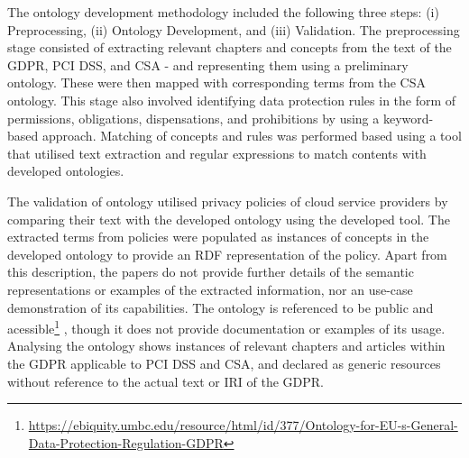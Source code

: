 The ontology development methodology included the following three steps: (i) Preprocessing, (ii) Ontology Development, and (iii) Validation. The preprocessing stage consisted of extracting relevant chapters and concepts from the text of the GDPR, PCI DSS, and CSA - and representing them using a preliminary ontology. These were then mapped with corresponding terms from the CSA ontology. This stage also involved identifying data protection rules in the form of permissions, obligations, dispensations, and prohibitions by using a keyword-based approach. Matching of concepts and rules was performed based using a tool that utilised text extraction and regular expressions to match contents with developed ontologies.

The validation of ontology utilised privacy policies of cloud service providers by comparing their text with the developed ontology using the developed tool. The extracted terms from policies were populated as instances of concepts in the developed ontology to provide an RDF representation of the policy. Apart from this description, the papers do not provide further details of the semantic representations or examples of the extracted information, nor an use-case demonstration of its capabilities. The ontology is referenced to be public and acessible\footnote{\url{https://ebiquity.umbc.edu/resource/html/id/377/Ontology-for-EU-s-General-Data-Protection-Regulation-GDPR}} \cite{elluri_knowledge_2018}, though it does not provide documentation or examples of its usage. Analysing the ontology shows instances of relevant chapters and articles within the GDPR applicable to PCI DSS and CSA, and declared as generic resources without reference to the actual text or IRI of the GDPR.

